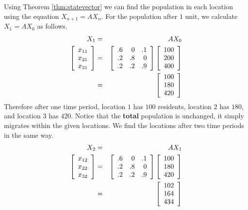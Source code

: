 \begin{solution}
Using Theorem \ref{thm:statevector} we can find the population in each location using the equation $X_{n+1} = AX_n$. For the population after $1$ unit, we calculate $X_1 = AX_0$ as follows.
\begin{eqnarray*}
X_1 &=& AX_0 \\
\left[ \begin{array}{r}
x_{11} \\
x_{21} \\
x_{31}
\end{array}\right] 
&=& 
\left[
\begin{array}{rrr}
.6 & 0 & .1 \\
.2 & .8 & 0 \\
.2 & .2 & .9
\end{array}
\right] 
\left[
\begin{array}{r}
100 \\
200 \\
400
\end{array}
\right] \\
&=& 
\left[
\begin{array}{r}
100 \\
180 \\
420
\end{array}\right]
\end{eqnarray*}
Therefore after one time period, location $1$ has $100$ residents, location $2$ has $180$, and location $3$ has $420$. Notice that the \textbf{total} population is unchanged, it simply migrates within the given locations.
We find the locations after two time periods in the same way. 
\begin{eqnarray*}
X_2 &=& AX_1 \\
\left[ \begin{array}{r}
x_{12} \\
x_{22} \\
x_{32}
\end{array}\right] 
&=& 
\left[
\begin{array}{rrr}
.6 & 0 & .1 \\
.2 & .8 & 0 \\
.2 & .2 & .9
\end{array}
\right] 
\left[
\begin{array}{r}
100 \\
180 \\
420
\end{array}
\right] \\
&=& 
\left[
\begin{array}{r}
102 \\
164 \\
434
\end{array}\right]
\end{eqnarray*}


\end{solution}
